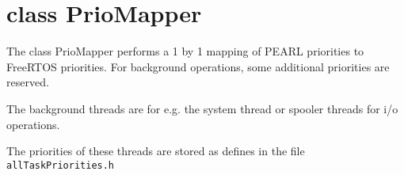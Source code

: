 \section{class PrioMapper}
The class PrioMapper performs a 1 by 1 mapping of PEARL priorities to FreeRTOS
priorities. For background operations, some additional priorities are reserved.

The background threads are for e.g.  the system thread or spooler threads
for i/o operations.

The priorities of these threads are stored as defines in the file
\texttt{allTaskPriorities.h}
 
